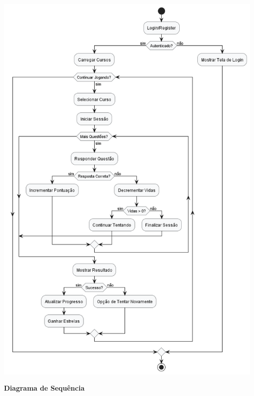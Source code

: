 \documentclass[12pt, openany, oneside, a4paper, english, brazil]{abntex2}   %
\begin{document}
\begin{center}
\includegraphics[width=\linewidth]{figuras/DiagramsUMLs/Math Pow Activity.png}
\label{fig:diagrama-de-atividades}
\end{center}

\item \textbf{Diagrama de Sequência}
\end{document}
